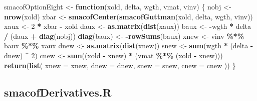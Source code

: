 \documentclass[
  12pt,
]{article}
\newenvironment{Shaded}{\begin{snugshade}}{\end{snugshade}}
\newcommand{\AttributeTok}[1]{\textcolor[rgb]{0.13,0.29,0.53}{#1}}
\newcommand{\ControlFlowTok}[1]{\textcolor[rgb]{0.13,0.29,0.53}{\textbf{#1}}}
\newcommand{\DecValTok}[1]{\textcolor[rgb]{0.00,0.00,0.81}{#1}}
\newcommand{\FunctionTok}[1]{\textcolor[rgb]{0.13,0.29,0.53}{\textbf{#1}}}
\newcommand{\NormalTok}[1]{#1}
\newcommand{\OtherTok}[1]{\textcolor[rgb]{0.56,0.35,0.01}{#1}}
\newcommand{\SpecialCharTok}[1]{\textcolor[rgb]{0.81,0.36,0.00}{\textbf{#1}}}
\begin{document}
\begin{Shaded}
\begin{Highlighting}[]
\NormalTok{smacofOptionEight }\OtherTok{\textless{}{-}} \ControlFlowTok{function}\NormalTok{(xold, delta, wgth, vmat, vinv) \{}
\NormalTok{  nobj }\OtherTok{\textless{}{-}} \FunctionTok{nrow}\NormalTok{(xold)}
\NormalTok{  xbar }\OtherTok{\textless{}{-}} \FunctionTok{smacofCenter}\NormalTok{(}\FunctionTok{smacofGuttman}\NormalTok{(xold, delta, wgth, vinv))}
\NormalTok{  xaux }\OtherTok{\textless{}{-}} \DecValTok{2} \SpecialCharTok{*}\NormalTok{ xbar }\SpecialCharTok{{-}}\NormalTok{ xold}
\NormalTok{  daux }\OtherTok{\textless{}{-}} \FunctionTok{as.matrix}\NormalTok{(}\FunctionTok{dist}\NormalTok{(xaux))}
\NormalTok{  baux }\OtherTok{\textless{}{-}} \SpecialCharTok{{-}}\NormalTok{wgth }\SpecialCharTok{*}\NormalTok{ delta }\SpecialCharTok{/}\NormalTok{ (daux }\SpecialCharTok{+} \FunctionTok{diag}\NormalTok{(nobj))}
  \FunctionTok{diag}\NormalTok{(baux) }\OtherTok{\textless{}{-}} \SpecialCharTok{{-}}\FunctionTok{rowSums}\NormalTok{(baux)}
\NormalTok{  xnew }\OtherTok{\textless{}{-}}\NormalTok{ vinv }\SpecialCharTok{\%*\%}\NormalTok{ baux }\SpecialCharTok{\%*\%}\NormalTok{ xaux}
\NormalTok{  dnew }\OtherTok{\textless{}{-}} \FunctionTok{as.matrix}\NormalTok{(}\FunctionTok{dist}\NormalTok{(xnew))}
\NormalTok{  snew }\OtherTok{\textless{}{-}} \FunctionTok{sum}\NormalTok{(wgth }\SpecialCharTok{*}\NormalTok{ (delta }\SpecialCharTok{{-}}\NormalTok{ dnew) }\SpecialCharTok{\^{}} \DecValTok{2}\NormalTok{)}
\NormalTok{  cnew }\OtherTok{\textless{}{-}} \FunctionTok{sum}\NormalTok{((xold }\SpecialCharTok{{-}}\NormalTok{ xnew) }\SpecialCharTok{*}\NormalTok{ (vmat }\SpecialCharTok{\%*\%}\NormalTok{ (xold }\SpecialCharTok{{-}}\NormalTok{ xnew)))}
  \FunctionTok{return}\NormalTok{(}\FunctionTok{list}\NormalTok{(}
    \AttributeTok{xnew =}\NormalTok{ xnew,}
    \AttributeTok{dnew =}\NormalTok{ dnew,}
    \AttributeTok{snew =}\NormalTok{ snew,}
    \AttributeTok{cnew =}\NormalTok{ cnew}
\NormalTok{  ))}
\NormalTok{\}}
\end{Highlighting}
\end{Shaded}

\subsection{smacofDerivatives.R}\label{smacofderivatives.r}
\end{document}
